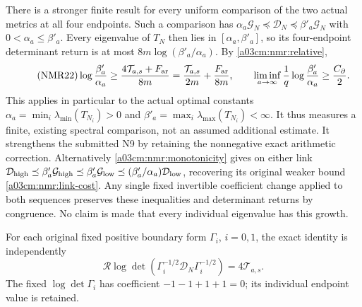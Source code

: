 \documentclass[11pt,a4paper]{article}
\begin{document}
There is a stronger finite result for every uniform comparison of the
two actual metrics at all four endpoints. Such a comparison has
$\alpha_a\mathcal G_N\preceq\mathcal D_N
\preceq\beta'_a\mathcal G_N$ with $0<\alpha_a\leq\beta'_a$.
Every eigenvalue of $T_N$ then lies in
$[\alpha_a,\beta'_a]$, so its four-endpoint determinant return is at
most $8m\log(\beta'_a/\alpha_a)$. By \eqref{a03cm:nmr:relative},
\begin{equation}\tag{NMR22}\label{a03cm:nmr:uniform-cost}
\log\frac{\beta'_a}{\alpha_a}
\geq\frac{4\mathcal T_{a,s}+F_{\rm ar}}{8m}
=\frac{\mathcal T_{a,s}}{2m}+\frac{F_{\rm ar}}{8m},\qquad
\liminf_{a\to\infty}\frac1q\log\frac{\beta'_a}{\alpha_a}
\geq\frac{C_\partial}{2}.
\end{equation}
This applies in particular to the actual optimal constants
$\alpha_a=\min_i\lambda_{\min}(T_{N_i})>0$ and
$\beta'_a=\max_i\lambda_{\max}(T_{N_i})<\infty$.
It thus measures a finite, existing spectral comparison, not an
assumed additional estimate. It strengthens the submitted N9 by
retaining the nonnegative exact arithmetic correction.
Alternatively \eqref{a03cm:nmr:monotonicity} gives on either link
$\mathcal D_{\rm high}\preceq\beta'_a\mathcal G_{\rm high}
\preceq\beta'_a\mathcal G_{\rm low}
\preceq(\beta'_a/\alpha_a)\mathcal D_{\rm low}$,
recovering its original weaker bound \eqref{a03cm:nmr:link-cost}.
Any single fixed invertible coefficient change applied to both
sequences preserves these inequalities and determinant returns by
congruence. No claim is made that every individual eigenvalue has
this growth.

For each original fixed positive boundary form $\Gamma_i$, $i=0,1$,
the exact identity is independently
\begin{equation}\tag{NMR23}\label{a03cm:nmr:fixed-boundary}
\mathcal R\log\det
  (\Gamma_i^{-1/2}\mathcal D_N\Gamma_i^{-1/2})
=4\mathcal T_{a,s}.
\end{equation}
The fixed $\log\det\Gamma_i$ has coefficient
$-1-1+1+1=0$; its individual endpoint value is retained.
\end{document}

